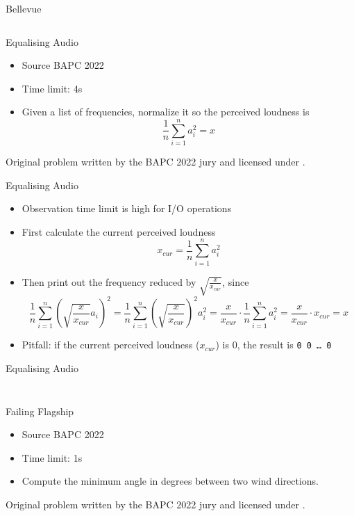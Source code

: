 \documentclass[11pt,pdf, aspectratio=169]{beamer}
\begin{document}
  \begin{frame}[containsverbatim]{Bellevue}
    \inputminted{python}{code/session-1/python/bapc-b.py}
  \end{frame}
  \begin{frame}{Equalising Audio}
    \begin{itemize}
      \item Source BAPC 2022
      \item Time limit: 4s
      \item  Given a list of frequencies, normalize it so the perceived loudness is \[\frac{1}{n} \sum^n_{i=1}a_i^2=x\]
    \end{itemize}
    Original problem written by the BAPC 2022 jury and licensed under \doclicenseLongNameRef.

    \doclicenseImage
  \end{frame}
  \begin{frame}{Equalising Audio}
    \begin{itemize}
      \item Observation time limit is high for I/O operations
      \item First calculate the current perceived loudness \[x_{cur} = \frac{1}{n} \sum^n_{i=1}a_i^2\]
      \item Then print out the frequency reduced by $\sqrt{\frac{x}{x_{cur}}}$, since
      \[\frac{1}{n} \sum^n_{i=1}\left(\sqrt{\frac{x}{x_{cur}}}a_i\right)^2 = \frac{1}{n} \sum^n_{i=1}\left(\sqrt{\frac{x}{x_{cur}}}\right)^2a_i^2 = \frac{x}{x_{cur}}\cdot \frac{1}{n}\sum^n_{i=1}a_i^2 = \frac{x}{x_{cur}}\cdot x_{cur} = x\]
      \item Pitfall: if the current perceived loudness ($x_{cur}$) is 0, the result is \texttt{0 0 \ldots{} 0}
    \end{itemize}
  \end{frame}
  \begin{frame}[containsverbatim]{ Equalising Audio}
    \inputminted{python}{code/session-1/python/bapc-e.py}
    \inputminted{kotlin}{code/session-1/kotlin/bapc-e.kt}
  \end{frame}
  \begin{frame}{Failing Flagship}
    \begin{itemize}
      \item Source BAPC 2022
      \item Time limit: 1s
      \item  Compute the minimum angle in degrees between two wind directions.
    \end{itemize}
    Original problem written by the BAPC 2022 jury and licensed under \doclicenseLongNameRef.

    \doclicenseImage
  \end{frame}
\end{document}
